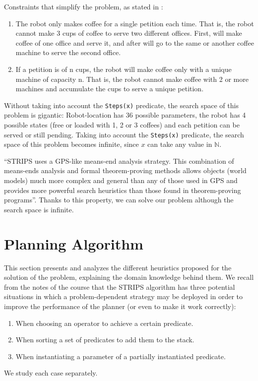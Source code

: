 \documentclass[12pt,a4paper,oneside]{article}
\numberwithin{equation}{section}
\numberwithin{equation}{section}
\theoremstyle{definition}
\begin{document}
Constraints that simplify the problem, as stated in \cite{problemdefinition}:
\begin{enumerate}
	\item The robot only makes coffee for a single petition each time. That is, the robot cannot make 3 cups of coffee to serve two different offices. First, will make coffee of one office and serve it, and after will go to the same or another coffee machine to serve the second office.
	\item If a petition is of n cups, the robot will make coffee only with a unique machine of capacity n. That is, the robot cannot make coffee with 2 or more machines and accumulate the cups to serve a unique petition.
\end{enumerate}


Without taking into account the \texttt{Steps(x)} predicate, the search space of this problem is gigantic: Robot-location has 36 possible parameters, the robot has 4 possible states (free or loaded with 1, 2 or 3 coffees) and each petition can be served or still pending. Taking into account the \texttt{Steps(x)} predicate, the search space of this problem becomes infinite, since $x$ can take any value in $\mathbb{N}$.


“STRIPS uses a GPS-like means-end analysis strategy\cite{gps}. This combination of means-ends analysis and formal theorem-proving methods allows objects (world models) much more complex and general than any of those used in GPS and provides more powerful search heuristics than those found in theorem-proving programs”\cite{strips}. Thanks to this property, we can solve our problem although the search space is infinite.



\section{Planning Algorithm} \label{Planning Algorithm}

This section presents and analyzes the different heuristics proposed for the solution of the problem, explaining the domain knowledge behind them. We recall from the notes of the course\cite{notes} that the STRIPS algorithm has three potential situations in which a problem-dependent strategy may be deployed in order to improve the performance of the planner (or even to make it work correctly):
\begin{enumerate}
	\item When choosing an operator to achieve a certain predicate.
	\item When sorting a set of predicates to add them to the stack.
	\item When instantiating a parameter of a partially instantiated predicate.
\end{enumerate}
We study each case separately.
\end{document}
